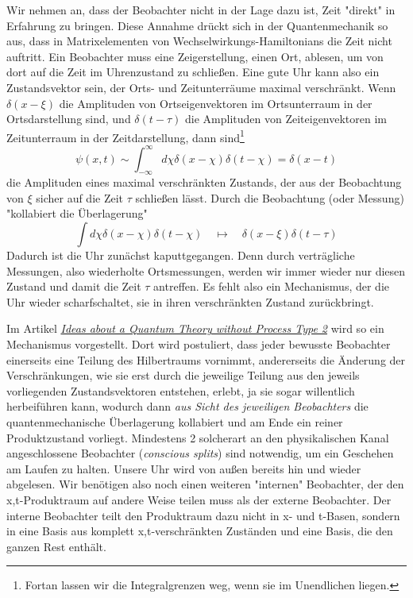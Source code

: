 \documentclass[12pt]{article}
\begin{document}
Wir nehmen an, dass der Beobachter nicht in der Lage dazu ist, Zeit "direkt" in Erfahrung zu bringen. Diese Annahme drückt sich in der Quantenmechanik so aus, dass in Matrixelementen von Wechselwirkungs-Hamiltonians die Zeit nicht auftritt. Ein Beobachter muss eine Zeigerstellung, einen Ort, ablesen, um von dort auf die Zeit im Uhrenzustand zu schließen. Eine gute Uhr kann also ein Zustandsvektor sein, der Orts- und Zeitunterräume maximal verschränkt. Wenn $\delta(x-\xi)$ die Amplituden von Ortseigenvektoren im Ortsunterraum in der Ortsdarstellung sind, und $\delta(t-\tau)$ die Amplituden von Zeiteigenvektoren im Zeitunterraum in der Zeitdarstellung, dann sind\footnote{Fortan lassen wir die Integralgrenzen weg, wenn sie im Unendlichen liegen.}
\begin{equation} 
\label{eq:psi_clock}
\psi(x,t) \sim \int_{-\infty}^{\infty} d\chi \delta(x-\chi) \delta(t-\chi) = \delta(x-t)
\end{equation}
die Amplituden eines maximal verschränkten Zustands, der aus der Beobachtung von $\xi$ sicher auf die Zeit $\tau$ schließen lässt. Durch die Beobachtung (oder Messung) "kollabiert die Überlagerung"
\begin{equation} 
\label{eq:collapse}
\int d\chi \delta(x-\chi) \delta(t-\chi) \quad \longmapsto \quad \delta(x-\xi)\delta(t-\tau)
\end{equation}
Dadurch ist die Uhr zunächst kaputtgegangen. Denn durch verträgliche Messungen, also wiederholte Ortsmessungen, werden wir immer wieder nur diesen Zustand und damit die Zeit $\tau$ antreffen. Es fehlt also ein Mechanismus, der die Uhr wieder scharfschaltet, sie in ihren verschränkten Zustand zurückbringt.

Im Artikel \emph{\href{https://docs.google.com/document/d/1OrmVETmnBSe5c0CpTbKH8Vq5pWFuB8QUez-KqHTaarQ/edit?usp=sharing}{Ideas about a Quantum Theory without Process Type 2}} wird so ein Mechanismus vorgestellt. Dort wird postuliert, dass jeder bewusste Beobachter einerseits eine Teilung des Hilbertraums vornimmt, andererseits die Änderung der Verschränkungen, wie sie erst durch die jeweilige Teilung aus den jeweils vorliegenden Zustandsvektoren entstehen, erlebt, ja sie sogar willentlich herbeiführen kann, wodurch dann \emph{aus Sicht des jeweiligen Beobachters} die quantenmechanische Überlagerung kollabiert und am Ende ein reiner Produktzustand vorliegt. Mindestens 2 solcherart an den physikalischen Kanal angeschlossene Beobachter (\emph{conscious splits}) sind notwendig, um ein Geschehen am Laufen zu halten. Unsere Uhr wird von außen bereits hin und wieder abgelesen. Wir benötigen also noch einen weiteren "internen" Beobachter, der den x,t-Produktraum auf andere Weise teilen muss als der externe Beobachter. Der interne Beobachter teilt den Produktraum dazu nicht in x- und t-Basen, sondern in eine Basis aus komplett x,t-verschränkten Zuständen und eine Basis, die den ganzen Rest enthält.
\end{document}

